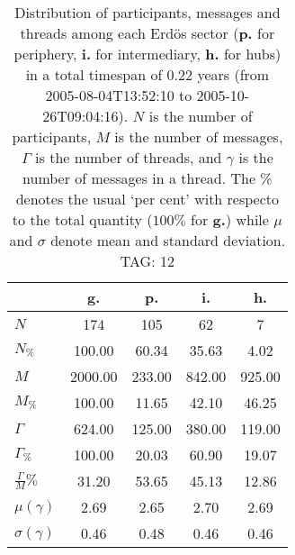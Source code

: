 \begin{table}[h!]
\begin{center}
\begin{tabular}{| l || c | c | c | c |}\hline
 & {\bf g.} & {\bf p.} & {\bf i.} & {\bf h.} \\\hline\hline
$N$ & 174  & 105  & 62  & 7 \\
$N_{\%}$ & 100.00  & 60.34  & 35.63  & 4.02 \\\hline
$M$ & 2000.00  & 233.00  & 842.00  & 925.00 \\
$M_{\%}$ & 100.00  & 11.65  & 42.10  & 46.25 \\\hline
$\Gamma$ & 624.00  & 125.00  & 380.00  & 119.00 \\
$\Gamma_{\%}$ & 100.00  & 20.03  & 60.90  & 19.07 \\\hline
$\frac{\Gamma}{M}\%$ & 31.20  & 53.65  & 45.13  & 12.86 \\
$\mu(\gamma)$ & 2.69  & 2.65  & 2.70  & 2.69 \\
$\sigma(\gamma)$ & 0.46  & 0.48  & 0.46  & 0.46 \\\hline
\end{tabular}
\caption{Distribution of participants, messages and threads among each Erd\"os sector ({\bf p.} for periphery, {\bf i.} for intermediary, 
    {\bf h.} for hubs) in a total timespan of 0.22 years (from 2005-08-04T13:52:10 to 2005-10-26T09:04:16). $N$ is the number of participants, $M$ is the number of messages, $\Gamma$ is the number of threads, and $\gamma$ is the number of messages in a thread.
    The \% denotes the usual `per cent' with respecto to the total quantity ($100\%$ for {\bf g.})
    while $\mu$ and $\sigma$ denote mean and standard deviation. TAG: 12}
\end{center}
\end{table}